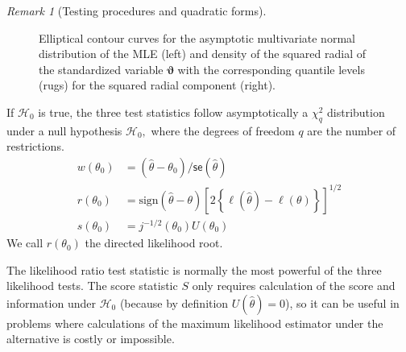 \documentclass[
  11pt,
  letterpaper,
]{scrbook}
\theoremstyle{definition}
\theoremstyle{definition}
\theoremstyle{plain}
\theoremstyle{plain}
\theoremstyle{remark}
\newtheorem{refremark}{Remark}[chapter]
\begin{document}
\begin{refremark}[Testing procedures and quadratic forms]
\begin{figure}[ht!]
{}

\caption{\label{fig-ellipses}Elliptical contour curves for the
asymptotic multivariate normal distribution of the MLE (left) and
density of the squared radial of the standardized variable
\(\boldsymbol{\vartheta}\) with the corresponding quantile levels (rugs)
for the squared radial component (right).}

\end{figure}%

\label{rem-nulldist}

\end{refremark}

If \(\mathscr{H}_0\) is true, the three test statistics follow
asymptotically a \(\chi^2_q\) distribution under a null hypothesis
\(\mathscr{H}_0,\) where the degrees of freedom \(q\) are the number of
restrictions. \begin{align*}
w(\theta_0)&=(\widehat{\theta}-\theta_0)/\mathsf{se}(\widehat{\theta}) \\
r({\theta_0}) &= \mathrm{sign}(\widehat{\theta}-\theta)\left[2
\left\{\ell(\widehat{\theta})-\ell(\theta)\right\}\right]^{1/2} \\
s(\theta_0)&=j^{-1/2}(\theta_0)U(\theta_0)
\end{align*} We call \(r({\theta_0})\) the directed likelihood root.

The likelihood ratio test statistic is normally the most powerful of the
three likelihood tests. The score statistic \(S\) only requires
calculation of the score and information under \(\mathscr{H}_0\)
(because by definition \(U(\widehat{\theta})=0\)), so it can be useful
in problems where calculations of the maximum likelihood estimator under
the alternative is costly or impossible.
\end{document}
